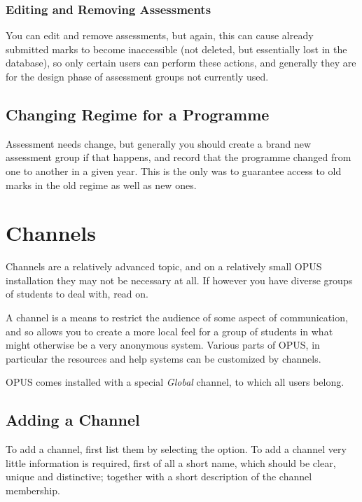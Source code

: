 \documentclass[12 pt]{book}
\begin{document}
\subsubsection{Editing and Removing Assessments}

You can edit and remove assessments, but again, this can cause already submitted
marks to become inaccessible (not deleted, but essentially lost in the database),
so only certain users can perform these actions, and generally they are for the
design phase of assessment groups not currently used.

\subsection{Changing Regime for a Programme}

Assessment needs change, but generally you should create a brand new assessment
group if that happens, and record that the programme changed from one to 
another in a given year. This is the only was to guarantee access to old
marks in the old regime as well as new ones.

\section{Channels}

Channels are a relatively advanced topic, and on a relatively small OPUS
installation they may not be necessary at all. If however you have diverse
groups of students to deal with, read on.

A channel is a means to restrict the audience of some aspect of communication,
and so allows you to create a more local feel for a group of students in what
might otherwise be a very anonymous system. Various parts of OPUS, in particular
the resources and help systems can be customized by channels.

OPUS comes installed with a special \emph{Global} channel, to which all users
belong.

\subsection{Adding a Channel}

To add a channel, first list them by selecting the 
 option. To add a channel very little
information is required, first of all a short name, which should be clear,
unique and distinctive; together with a short description of the channel
membership.
\end{document}
